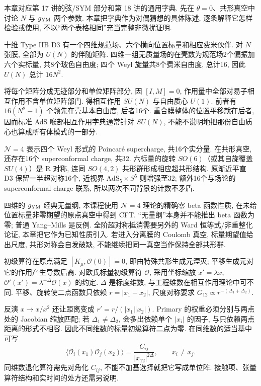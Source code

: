 本章对应第 17 讲的弦/SYM 部分和第 18 讲的通用字典. 先在 $\theta=0$、共形真空中讨论 $N$ 与 $g_{\rm YM}$ 两个参数. 本章把字典作为对偶猜想的具体陈述, 逐条解释它怎样检验或使用, 不以“两个表格相同”充当完整非微扰证明.

十维 Type IIB D3 有一个四维规范场、六个横向位置标量和相应费米伙伴. 对 $N$ 张膜, 全部为 $U(N)$ 的伴随矩阵. 四维一组无质量场的在壳数为规范场2个偏振加六个实标量, 共8个玻色自由度; 四个 Weyl 旋量共8个费米自由度, 总计16, 因此 $U(N)$ 总计 $16N^2$.

将每个矩阵分成无迹部分和单位矩阵部分, 因 $[I,M]=0$, 作用量中全部对易子相互作用不含单位矩阵部门. 得相互作用 $SU(N)$ 与自由质心 $U(1)$. 前者有 $16(N^2-1)$ 个领先在壳基本自由度, 后者16个. 重合膜整体的位置平移就在后者, 因而标准 AdS 喉部相互作用字典通常针对 $SU(N)$, 不能不说明地把那份自由质心也算成所有体模式的一部分.

$\mathcal N=4$ 表示四个 Weyl 形式的 Poincaré supercharge, 共16个实分量. 在共形真空, 还存在16个 superconformal charge, 共32. 六标量的旋转 $SO(6)$（或其自旋覆盖 $SU(4)$）是 R 对称, 连同 $SO(4,2)$ 共形群形成相应超共形结构. 原渐近平直 D3 保留一半超对称16个, 近视界 $\mathrm{AdS}_5\times S^5$ 则增强至32; 额外16个与场论的 superconformal charge 联系, 所以两次不同背景的计数不矛盾.

四维的 $g_{\rm YM}$ 经典无量纲, 本课程使用 $\mathcal N=4$ 理论的精确零 beta 函数性质, 在未给位置标量非零期望的原点真空中得到 CFT. “无量纲”本身并不能推出 beta 函数为零; 普通 Yang--Mills 是反例. 全阶超对称抵消需要另外的 Ward 恒等式/非重整化论证, 本章把它作为已知性质引入. 若进入分离膜的 Coulomb 真空, 标量期望值给出尺度, 共形对称会自发破缺, 不能继续把同一真空当作保持全部共形群.

初级算符在原点满足 $[K_\mu,\mathcal O(0)]=0$, 即由特殊共形生成元湮灭; 平移生成元对它的作用产生导数后裔. 对欧氏标量初级算符 $\mathcal O$, 采用坐标缩放 $x'=\lambda x$, $\mathcal O'(x')=\lambda^{-\Delta}\mathcal O(x)$ 的约定. $\Delta$ 是标度维数, 与工程维数在相互作用理论中可不同. 平移、旋转使二点函数只依赖 $r=|x_1-x_2|$, 尺度对称要求 $G_{12}\propto r^{-(\Delta_1+\Delta_2)}$.

反演 $x\to x/x^2$ 还让距离变成 $r'=r/(|x_1||x_2|)$. Primary 的权重必须分别与两点处的 Jacobian 缩放匹配; 若 $\Delta_1\ne\Delta_2$, 会多出依赖单个 $|x_i|$ 的因子, 与只依赖两点距离的形式不相容. 因此不同维数的标量初级算符二点为零. 在同维数的适当基中可写
\[
\langle\mathcal O_i(x_1)\mathcal O_j(x_2)\rangle
=\frac{C_{ij}}{|x_{12}|^{2\Delta}},\qquad
x_i\ne x_j.
\]
同维数退化算符需先对角化 $C_{ij}$, 不能不加基选择就把它写成单位阵. 接触项、张量算符结构和实时间的处方还需另说明.

